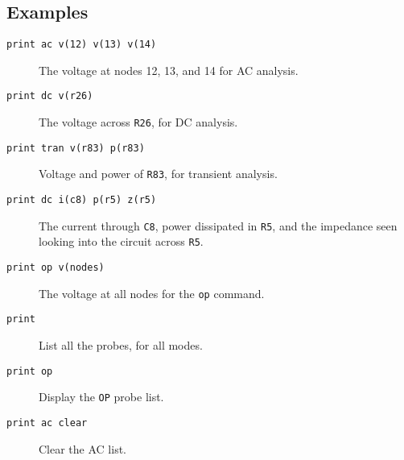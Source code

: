 \subsection{Examples}

\begin{description}

\item[{\tt print ac v(12) v(13) v(14)}] The voltage at nodes 12, 13, and 14
for AC analysis.

\item[{\tt print dc v(r26)}] The voltage across {\tt R26}, for DC analysis.

\item[{\tt print tran v(r83) p(r83)}] Voltage and power of {\tt R83}, for
transient analysis.

\item[{\tt print dc i(c8) p(r5) z(r5)}] The current through {\tt C8}, power
dissipated in {\tt R5}, and the impedance seen looking into the circuit
across {\tt R5}.

\item[{\tt print op v(nodes)}] The voltage at all nodes for the {\tt op}
command.

\item[{\tt print}] List all the probes, for all modes.

\item[{\tt print op}] Display the {\tt OP} probe list.

\item[{\tt print ac clear}] Clear the AC list.

\end{description}
